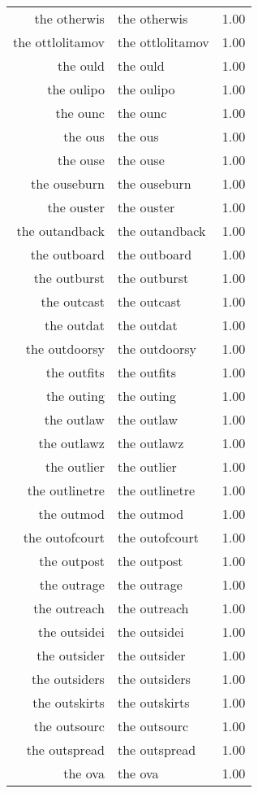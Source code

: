 \begin{table}[ht]
\begin{tabular}{rlr}
  the otherwis & the otherwis & 1.00 \\ 
  the ottlolitamov & the ottlolitamov & 1.00 \\ 
  the ould & the ould & 1.00 \\ 
  the oulipo & the oulipo & 1.00 \\ 
  the ounc & the ounc & 1.00 \\ 
  the ous & the ous & 1.00 \\ 
  the ouse & the ouse & 1.00 \\ 
  the ouseburn & the ouseburn & 1.00 \\ 
  the ouster & the ouster & 1.00 \\ 
  the outandback & the outandback & 1.00 \\ 
  the outboard & the outboard & 1.00 \\ 
  the outburst & the outburst & 1.00 \\ 
  the outcast & the outcast & 1.00 \\ 
  the outdat & the outdat & 1.00 \\ 
  the outdoorsy & the outdoorsy & 1.00 \\ 
  the outfits & the outfits & 1.00 \\ 
  the outing & the outing & 1.00 \\ 
  the outlaw & the outlaw & 1.00 \\ 
  the outlawz & the outlawz & 1.00 \\ 
  the outlier & the outlier & 1.00 \\ 
  the outlinetre & the outlinetre & 1.00 \\ 
  the outmod & the outmod & 1.00 \\ 
  the outofcourt & the outofcourt & 1.00 \\ 
  the outpost & the outpost & 1.00 \\ 
  the outrage & the outrage & 1.00 \\ 
  the outreach & the outreach & 1.00 \\ 
  the outsidei & the outsidei & 1.00 \\ 
  the outsider & the outsider & 1.00 \\ 
  the outsiders & the outsiders & 1.00 \\ 
  the outskirts & the outskirts & 1.00 \\ 
  the outsourc & the outsourc & 1.00 \\ 
  the outspread & the outspread & 1.00 \\ 
  the ova & the ova & 1.00 \\ 

\end{tabular}
\end{table}
